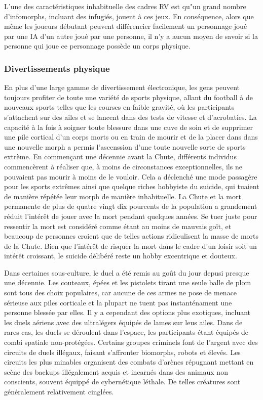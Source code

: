                L'une des caractéristiques inhabituelle des cadres RV est qu"un grand nombre d'infomorphs, incluant des infugiés, jouent à ces jeux. En conséquence, alors que même les joueurs débutant peuvent différencier facilement un personnage joué par une IA d'un autre joué par une personne, il n'y a aucun moyen de savoir si la personne qui joue ce personnage possède un corps physique. 

               \subsubsection{Divertissements physique} \label{sec:phys-entert} 

               En plus d'une large gamme de divertissement électronique, les gens peuvent toujours profiter de toute une variété de sports physique, allant du football à de nouveaux sports telles que les courses en faible gravité, où les participants s'attachent sur des ailes et se lancent dans des tests de vitesse et d'acrobaties. La capacité à la fois à soigner toute blessure dans une cuve de soin et de supprimer une pile cortical d'un corps morts ou en train de mourir et de la placer dans dans une nouvelle morph a permis l'ascenssion d'une toute nouvelle sorte de sports extrème. En commençant une décennie avant la Chute, différents individus commencèrent à réaliser que, à moins de circonstances exceptionnelles, ils ne pouvaient pas mourir à moins de le vouloir. Cela a déclenché une mode passagère pour les sports extrêmes ainsi que quelque riches hobbyiste du suicide, qui tuaient de manière répétée leur morph de manière inhabituelle. La Chute et la mort permanente de plus de quatre vingt dix pourcents de la population a grandement réduit l'intérêt de jouer avec la mort pendant quelques années. Se tuer juste pour ressentir la mort est considéré comme étant au moins de mauvais goït, et beaucoup de personnes croient que de telles actions ridiculisent la masse de morts de la Chute. Bien que l'intérêt de risquer la mort dans le cadre d'un loisir soit un intérêt croissant, le suicide délibéré reste un hobby excentrique et douteux. 

               Dans certaines sous-culture, le duel a été remis au goût du jour depusi presque une décennie. Les couteaux, épées et les pistolets tirant une seule balle de plom sont tous des choix populaires, car aucune de ces armes ne pose de menace sérieuse aux piles corticale et la plupart ne tuent pas instanténament une personne blessée par elles. Il y a cependant des options plus exotiques, incluant les duels aériens avec des ultralégers équipés de lames sur leus ailes. Dans de rares cas, les duels se déroulent dans l'espace, les participants étant équipés de combi spatiale non-protégées. Certains groupes criminels font de l'argent avec des circuits de duels illégaux, faisant s'affronter biomorphs, robots et élevés. Les circuits les plus minables organisent des combats d'arènes répugnant mettant en scène des backups illégalement acquis et incarnés dans des animaux non conscients, souvent équippé de cybernétique léthale. De telles créatures sont généralement relativement cinglées. 

